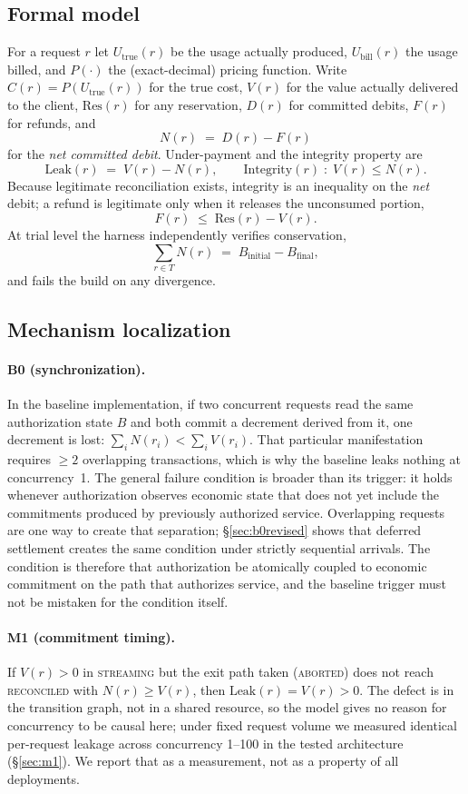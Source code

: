\subsection{Formal model}

For a request $r$ let $U_{\text{true}}(r)$ be the usage actually produced,
$U_{\text{bill}}(r)$ the usage billed, and $P(\cdot)$ the (exact-decimal) pricing
function. Write $C(r)=P(U_{\text{true}}(r))$ for the true cost, $V(r)$ for the value
actually delivered to the client, $\mathrm{Res}(r)$ for any reservation, $D(r)$ for
committed debits, $F(r)$ for refunds, and
\[
N(r) \;=\; D(r)-F(r)
\]
for the \emph{net committed debit}. Under-payment and the integrity property are
\[
\mathrm{Leak}(r) \;=\; V(r)-N(r),
\qquad
\mathrm{Integrity}(r)\;:\;V(r)\le N(r).
\]
Because legitimate reconciliation exists, integrity is an inequality on the
\emph{net} debit; a refund is legitimate only when it releases the unconsumed portion,
\[
F(r)\;\le\;\mathrm{Res}(r)-V(r).
\]
At trial level the harness independently verifies conservation,
\[
\textstyle\sum_{r\in T} N(r) \;=\; B_{\text{initial}}-B_{\text{final}},
\]
and fails the build on any divergence.

\subsection{Mechanism localization}

\paragraph{B0 (synchronization).} In the baseline implementation, if two concurrent
requests read the same authorization state $B$ and both commit a decrement derived from
it, one decrement is lost: $\sum_i N(r_i) < \sum_i V(r_i)$. That particular
manifestation requires $\ge 2$ overlapping transactions, which is why the baseline leaks
nothing at concurrency~1. The general failure condition is broader than its trigger: it
holds whenever authorization observes economic state that does not yet include the
commitments produced by previously authorized service. Overlapping requests are one way
to create that separation; \S\ref{sec:b0revised} shows that deferred settlement creates
the same condition under strictly sequential arrivals. The condition is therefore that
authorization be atomically coupled to economic commitment on the path that authorizes
service, and the baseline trigger must not be mistaken for the condition itself.

\paragraph{M1 (commitment timing).} If $V(r)>0$ in \textsc{streaming} but the exit
path taken (\textsc{aborted}) does not reach \textsc{reconciled} with $N(r)\ge V(r)$,
then $\mathrm{Leak}(r)=V(r)>0$. The defect is in the transition graph, not in a shared
resource, so the model gives no reason for concurrency to be causal here; under fixed
request volume we measured identical per-request leakage across concurrency 1--100 in
the tested architecture (\S\ref{sec:m1}). We report that as a measurement, not as a
property of all deployments.

